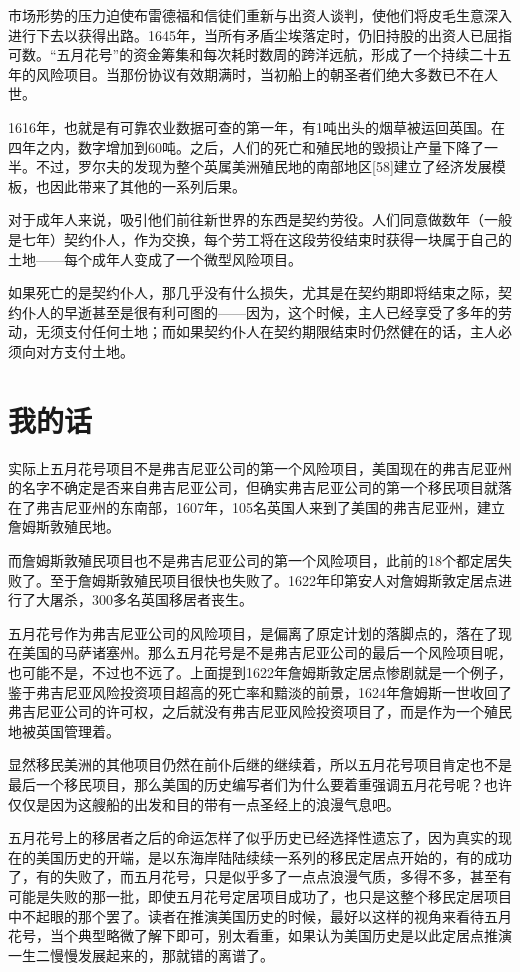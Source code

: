 \documentclass[12pt,oneside]{book}
\begin{document}
\begin{mdframed}
市场形势的压力迫使布雷德福和信徒们重新与出资人谈判，使他们将皮毛生意深入进行下去以获得出路。1645年，当所有矛盾尘埃落定时，仍旧持股的出资人已屈指可数。“五月花号”的资金筹集和每次耗时数周的跨洋远航，形成了一个持续二十五年的风险项目。当那份协议有效期满时，当初船上的朝圣者们绝大多数已不在人世。

\end{mdframed}


1616年，也就是有可靠农业数据可查的第一年，有1吨出头的烟草被运回英国。在四年之内，数字增加到60吨。之后，人们的死亡和殖民地的毁损让产量下降了一半。不过，罗尔夫的发现为整个英属美洲殖民地的南部地区[58]建立了经济发展模板，也因此带来了其他的一系列后果。

对于成年人来说，吸引他们前往新世界的东西是契约劳役。人们同意做数年（一般是七年）契约仆人，作为交换，每个劳工将在这段劳役结束时获得一块属于自己的土地——每个成年人变成了一个微型风险项目。

如果死亡的是契约仆人，那几乎没有什么损失，尤其是在契约期即将结束之际，契约仆人的早逝甚至是很有利可图的——因为，这个时候，主人已经享受了多年的劳动，无须支付任何土地；而如果契约仆人在契约期限结束时仍然健在的话，主人必须向对方支付土地。

\section{我的话}
实际上五月花号项目不是弗吉尼亚公司的第一个风险项目，美国现在的弗吉尼亚州的名字不确定是否来自弗吉尼亚公司，但确实弗吉尼亚公司的第一个移民项目就落在了弗吉尼亚州的东南部，1607年，105名英国人来到了美国的弗吉尼亚州，建立詹姆斯敦殖民地。

而詹姆斯敦殖民项目也不是弗吉尼亚公司的第一个风险项目，此前的18个都定居失败了。至于詹姆斯敦殖民项目很快也失败了。1622年印第安人对詹姆斯敦定居点进行了大屠杀，300多名英国移居者丧生。

五月花号作为弗吉尼亚公司的风险项目，是偏离了原定计划的落脚点的，落在了现在美国的马萨诸塞州。那么五月花号是不是弗吉尼亚公司的最后一个风险项目呢，也可能不是，不过也不远了。上面提到1622年詹姆斯敦定居点惨剧就是一个例子，鉴于弗吉尼亚风险投资项目超高的死亡率和黯淡的前景，1624年詹姆斯一世收回了弗吉尼亚公司的许可权，之后就没有弗吉尼亚风险投资项目了，而是作为一个殖民地被英国管理着。

显然移民美洲的其他项目仍然在前仆后继的继续着，所以五月花号项目肯定也不是最后一个移民项目，那么美国的历史编写者们为什么要着重强调五月花号呢？也许仅仅是因为这艘船的出发和目的带有一点圣经上的浪漫气息吧。

五月花号上的移居者之后的命运怎样了似乎历史已经选择性遗忘了，因为真实的现在的美国历史的开端，是以东海岸陆陆续续一系列的移民定居点开始的，有的成功了，有的失败了，而五月花号，只是似乎多了一点点浪漫气质，多得不多，甚至有可能是失败的那一批，即使五月花号定居项目成功了，也只是这整个移民定居项目中不起眼的那个罢了。读者在推演美国历史的时候，最好以这样的视角来看待五月花号，当个典型略微了解下即可，别太看重，如果认为美国历史是以此定居点推演一生二慢慢发展起来的，那就错的离谱了。
\end{document}
